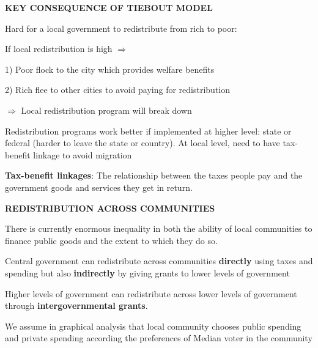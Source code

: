 \documentclass[landscape]{slides}
\begin{document}
%


\begin{slide}

\end{slide}

\begin{slide}
\begin{center}
{\bf KEY CONSEQUENCE OF TIEBOUT MODEL}
\end{center}

Hard for a local government to redistribute from rich to poor:

If local redistribution is high $\Rightarrow$

1) Poor flock to the city which provides welfare benefits

2) Rich flee to other cities to avoid paying for redistribution 

$\Rightarrow$ Local redistribution program will break down

Redistribution programs work better if implemented at higher level: state or federal (harder to leave the state or country). At local level, need to have tax-benefit linkage to avoid migration

{\bf Tax-benefit linkages}:
The relationship between the taxes people pay and the government goods and services they get in return.
\end{slide}


\begin{slide}
\begin{center}
{\bf REDISTRIBUTION ACROSS COMMUNITIES}
\end{center}

There is currently enormous inequality in both the ability of local communities to finance public goods and the extent to which they do so.

Central government can redistribute across communities \textbf{directly} using taxes and spending but also \textbf{indirectly} by giving grants to lower levels of government

Higher levels of government can redistribute across lower levels of government through \textbf{intergovernmental grants}.

We assume in graphical analysis that local community chooses public spending and private spending
according the preferences of Median voter in the community

\end{slide}
\end{document}
